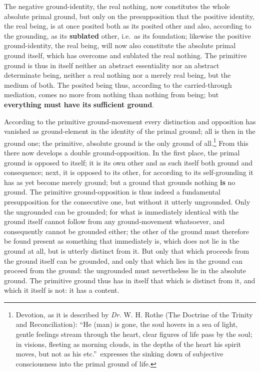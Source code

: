 \documentclass[12pt,a4paper,openany]{book}
\newcommand{\opage}[1]{\marginnote{\footnotesize\textit{[#1]}}}
\begin{document}
\opage{131}The negative ground-identity, the real nothing, now
constitutes the whole absolute primal ground, but only on
the presupposition that the positive identity, the real
being, is at once posited both as its posited
other and also, according to the grounding, as its \textbf{sublated}
other, i.e.\ as its foundation; likewise the positive
ground-identity, the real being, will now also
constitute the absolute primal ground itself, which has overcome
and sublated the real nothing. The primitive ground is
thus in itself neither an abstract essentiality nor
an abstract determinate being, neither a real nothing nor a
merely real being, but the medium of both. The posited
being thus, according to the carried-through mediation,
comes no more from nothing than nothing from being; but
\textbf{everything must have its} \textbf{sufficient ground}.

According to the primitive ground-movement every distinction
and opposition has vanished as ground-element in
the identity of the primal ground; all is then in the ground one; the
primitive, absolute ground is the only ground of all.\footnote{Devotion, as it is described by \textit{Dr.} W. H. Rothe (The Doctrine of the Trinity and Reconciliation): ``He (man) is gone, the soul hovers in a sea of light, gentle feelings stream through the heart, clear figures of life pass by the soul; in visions, fleeting as morning clouds, in the depths of the heart his spirit moves, but not as his etc.''\ expresses the sinking down of subjective consciousness into the primal ground of life.} From this there now develops a double ground-opposition.
In the first place, the primal ground is opposed to itself; it is its
own other and as such itself both ground and consequence; next, it is opposed to its other, for according to its self-grounding
it has as yet become merely ground; but a
ground that grounds nothing \textbf{is} no ground. The
\setcounter{footnote}{0}%
\opage{132}primitive ground-opposition is thus indeed a fundamental
presupposition for the consecutive one, but without it utterly
ungrounded. Only the ungrounded can be grounded;
for what is immediately identical with the ground itself
cannot follow from any ground-movement whatsoever, and
consequently cannot be grounded either; the other of the ground must
therefore be found present as something that immediately is, which does not
lie in the ground at all, but is utterly distinct from
it. But only that which proceeds from the ground itself
can be grounded, and only that which lies in the ground can
proceed from the ground: the ungrounded must nevertheless lie
in the absolute ground. The primitive ground thus has
in itself that which is distinct from it, and which it
itself is not: it has a content.
\end{document}
